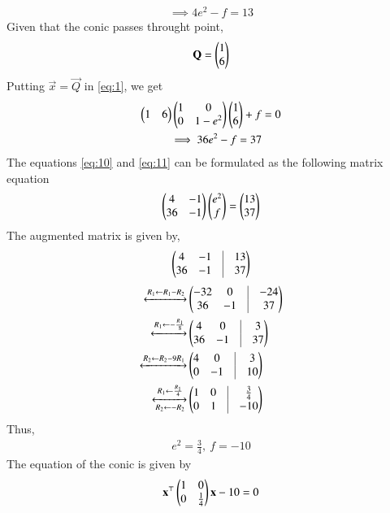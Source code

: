 \documentclass[journal,12pt,twocolumn]{IEEEtran}
\begin{document}
\begin{enumerate}
\begin{align}
\implies 4e^2 - f = 13 \label{eq:10}
\end{align}
Given that the conic passes throught point,
\begin{align}
\mathbf{Q} = \begin{pmatrix}1\\6\end{pmatrix} 
\end{align}
Putting $\vec{x} = \vec{Q}$ in \eqref{eq:1}, we get
\begin{align}
\begin{pmatrix}1&6\end{pmatrix}\begin{pmatrix}1&0\\0&1-e^2\end{pmatrix}\begin{pmatrix}1\\6\end{pmatrix} + f &= 0 \\
\implies 36e^2 - f = 37 \label{eq:11}
\end{align}
The equations \eqref{eq:10} and \eqref{eq:11} can be formulated as the following matrix equation
\begin{align}
\begin{pmatrix}4&-1\\36&-1\end{pmatrix}\begin{pmatrix}e^2\\f\end{pmatrix} = \begin{pmatrix}13\\37\end{pmatrix}
\label{eq:12}
\end{align}
The augmented matrix is given by,
\begin{align}
\myvec{4&-1&\vline&13\\36&-1&\vline&37}
\end{align}
\begin{align}
\xleftrightarrow[]{R_1\leftarrow R_1-R_2} &\myvec{-32&0&\vline&-24\\36&-1&\vline&37} \\
\xleftrightarrow[]{R_1\leftarrow-\frac{R_1}{8}}& \myvec{4&0&\vline&3\\36&-1&\vline&37} \\
\xleftrightarrow[]{R_2\leftarrow R_2-9R_1}
&\myvec{4&0&\vline&3\\0&-1&\vline&10} \\
\xleftrightarrow[R_2\leftarrow -R_2]{R_1\leftarrow \frac{R_1}{4}}
&\myvec{1&0&\vline&\frac{3}{4}\\0&1&\vline&-10}
\end{align}
Thus,
\begin{align}
e^2 = \frac{3}{4},\ f = -10
\end{align}
The equation of the conic is given by
\begin{align}
\mathbf{x}^\top\begin{pmatrix}1&0\\0&\frac{1}{4}\end{pmatrix}\mathbf{x} - 10 = 0
\end{align}
\begin{figure}[ht]
\centering

\end{figure}
\end{enumerate}
\end{document}
